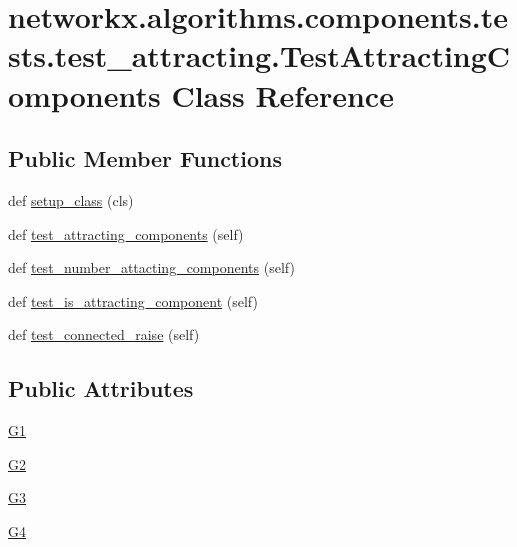 \hypertarget{classnetworkx_1_1algorithms_1_1components_1_1tests_1_1test__attracting_1_1TestAttractingComponents}{}\section{networkx.\+algorithms.\+components.\+tests.\+test\+\_\+attracting.\+Test\+Attracting\+Components Class Reference}
\label{classnetworkx_1_1algorithms_1_1components_1_1tests_1_1test__attracting_1_1TestAttractingComponents}
\subsection*{Public Member Functions}
\begin{DoxyCompactItemize}
\item 
def \hyperlink{classnetworkx_1_1algorithms_1_1components_1_1tests_1_1test__attracting_1_1TestAttractingComponents_ad8a2e9943c42c23d7a04a2e91f243227}{setup\+\_\+class} (cls)
\item 
def \hyperlink{classnetworkx_1_1algorithms_1_1components_1_1tests_1_1test__attracting_1_1TestAttractingComponents_a865a35ec6bf2990a4bcbc98135ae5bf1}{test\+\_\+attracting\+\_\+components} (self)
\item 
def \hyperlink{classnetworkx_1_1algorithms_1_1components_1_1tests_1_1test__attracting_1_1TestAttractingComponents_a4b56149cea2870d69aa3e38fc9eafa01}{test\+\_\+number\+\_\+attacting\+\_\+components} (self)
\item 
def \hyperlink{classnetworkx_1_1algorithms_1_1components_1_1tests_1_1test__attracting_1_1TestAttractingComponents_a791a7ad66f2aa8449364d89987012e88}{test\+\_\+is\+\_\+attracting\+\_\+component} (self)
\item 
def \hyperlink{classnetworkx_1_1algorithms_1_1components_1_1tests_1_1test__attracting_1_1TestAttractingComponents_a7349a8378526e59478ef4ea45d90b2ec}{test\+\_\+connected\+\_\+raise} (self)
\end{DoxyCompactItemize}
\subsection*{Public Attributes}
\begin{DoxyCompactItemize}
\item 
\hyperlink{classnetworkx_1_1algorithms_1_1components_1_1tests_1_1test__attracting_1_1TestAttractingComponents_a886974c25d4753199f2d97b04dde4a9d}{G1}
\item 
\hyperlink{classnetworkx_1_1algorithms_1_1components_1_1tests_1_1test__attracting_1_1TestAttractingComponents_a452eddbbbef90f990eebc8e20ebc58bb}{G2}
\item 
\hyperlink{classnetworkx_1_1algorithms_1_1components_1_1tests_1_1test__attracting_1_1TestAttractingComponents_a58a446c18d58a11e81ec2b0fc9391475}{G3}
\item 
\hyperlink{classnetworkx_1_1algorithms_1_1components_1_1tests_1_1test__attracting_1_1TestAttractingComponents_a9b9654a8f3adbee433b377c5f68750f4}{G4}
\end{DoxyCompactItemize}


